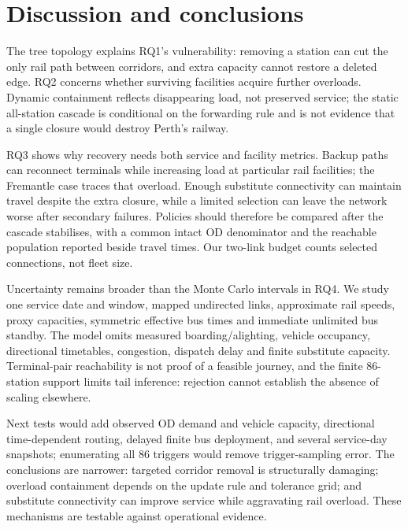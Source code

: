 
\section{Discussion and conclusions}
\label{sec:discussion}

The tree topology explains RQ1's vulnerability: removing a station can cut the
only rail path between corridors, and extra capacity cannot restore a deleted
edge. RQ2 concerns whether surviving facilities acquire further overloads.
Dynamic containment reflects disappearing load, not preserved service; the
static all-station cascade is conditional on the forwarding rule and is not
evidence that a single closure would destroy Perth's railway.

RQ3 shows why recovery needs both service and facility metrics. Backup paths
can reconnect terminals while increasing load at particular rail facilities;
the Fremantle case traces that overload. Enough substitute connectivity can
maintain travel despite the extra closure, while a limited selection can leave
the network worse after secondary failures. Policies should
therefore be compared after the cascade stabilises, with a common intact OD
denominator and the reachable population reported beside travel times. Our
two-link budget counts selected connections, not fleet size.

Uncertainty remains broader than the Monte Carlo intervals in RQ4. We study
one service date and window, mapped undirected links, approximate rail speeds,
proxy capacities, symmetric effective bus times and immediate unlimited bus
standby. The model omits measured boarding/alighting, vehicle occupancy,
directional timetables, congestion, dispatch delay and finite substitute
capacity. Terminal-pair reachability is not proof of a feasible journey, and
the finite 86-station support limits tail inference: rejection cannot establish
the absence of scaling elsewhere.

Next tests would add observed OD demand and vehicle capacity, directional
time-dependent routing, delayed finite bus deployment, and several service-day
snapshots; enumerating all 86 triggers would remove trigger-sampling error. The
conclusions are narrower: targeted corridor removal is structurally damaging;
overload containment depends on the update rule and tolerance grid; and
substitute connectivity can improve service while aggravating rail overload.
These mechanisms are testable against operational evidence.

